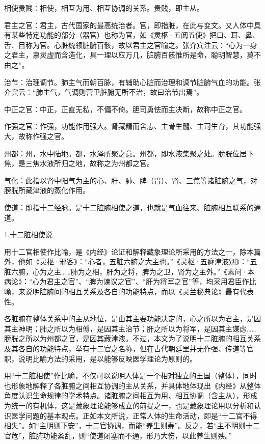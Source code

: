 \documentclass[12pt]{ctexbook}
\begin{document}
\begin{jiaozhu}
	\item 相使贵贱：相使，相互为用、相互协调的关系。贵贱，即主从。
	\item 君主之官：君主，古代国家的最高统治者。官，即指脏，在此与变文。又人体中具有某些特定功能的部分（器官）也称为官，如《灵枢·五阅五使》把口、耳、鼻、舌、目称为官。心脏统领脏腑百骸，故以君主之官喻之。张介宾注云：“心为一身之君主，禀灵虚而含造化，具一理以应万几，脏腑百骸惟所是命，聪明智慧，莫不由之”。
	\item 治节：治理调节。肺主气而朝百脉，有辅助心脏而治理和调节脏腑气血的功能。张介宾云：“肺主气，气调则营卫脏腑无所不治，故曰治节出焉”。
	\item 中正之官：中正，正直无私，不偏不倚。胆司勇怯而主决断，故称中正之官。
	\item 作强之官：作强，功能作用强大。肾藏精而舍志、主骨生髓、主司生育，其功能强大，故称作强之官。
	\item 州都：州，水中陆地。都，水泽所聚之意。州都，即水液集聚之处。膀胱位居下焦，是三焦水液所归之地，故称之为州都之官。
	\item 气化：此指以肾中阳气为主的心、肝、肺、脾（胃）、肾、三焦等诸脏腑之气，对膀胱所藏津液的蒸化作用。
	\item 使道：即指十二经脉。是十二脏腑相使之道，也就是气血往来、脏腑相互联系的通道。
\end{jiaozhu}


1.十二脏相使说

用十二官相使作比喻，是《内经》论证和解释藏象理论所采用的方法之一，除本篇外，他如《灵枢·邪客》：“心者，五脏六腑之大主也。”《灵枢·五癃津液别》：“五脏六腑，心为之主……肺为之相，肝为之将，脾为之卫，肾为之主外。”《素问·本病论》：“心为君主之官”、“脾为谏议之官”、“肝为将军之官”等，均采用君臣作比喻，来说明脏腑间的相互关系及各自的功能特点，而以《灵兰秘典论》最有代表性。

各脏腑在整体关系中的主从地位，是由其主要功能决定的，心之所以为君主，是因其主神明；肺之所以为相傅，是因其主治节；肝之所以为将军，是因其主谋虑……膀胱之所以为州都之官，是因其藏津液。不过，本文为了说明十二脏腑的相互关系及其各自的功能特点，举有十二官之名称，但在古代朝廷里并无作强、传道等官职，说明比喻方法的采用，是以能够反映医学理论为原则的。

用“十二脏相使”作比喻，不仅可以说明人体是一个相对独立的王国（整体），同时也形象地解释了各脏腑之间相互协调的主从关系，并具体地体现出《内经》从整体角度认识生命规律的学术特点。诸脏腑之间相互为用、相互协调（含主从），形成为统一的有机体，这是藏象理论能够成立的前提之一，也是藏象理论用以分析和认识医学问題的基本观点。正如本文所说，正常人体的生命活动，即是“十二官不得相失”。如“主明则下安”，十二官协调，而能“养生则寿”。反之，若“主不明则十二官危”，脏腑功能紊乱，则“使道闭塞而不通，形乃大伤，以此养生则殃。”
\end{document}
